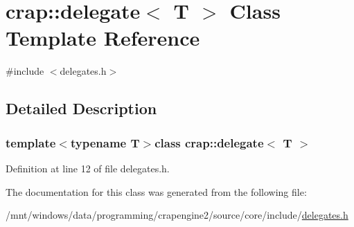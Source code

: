 \hypertarget{classcrap_1_1delegate}{\section{crap\+:\+:delegate$<$ T $>$ Class Template Reference}
\label{classcrap_1_1delegate}
}


{\ttfamily \#include $<$delegates.\+h$>$}



\subsection{Detailed Description}
\subsubsection*{template$<$typename T$>$class crap\+::delegate$<$ T $>$}



Definition at line 12 of file delegates.\+h.



The documentation for this class was generated from the following file\+:\begin{DoxyCompactItemize}
\item 
/mnt/windows/data/programming/crapengine2/source/core/include/\hyperlink{delegates_8h}{delegates.\+h}\end{DoxyCompactItemize}
